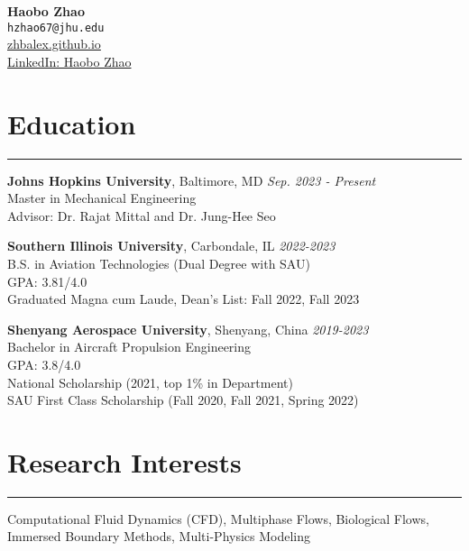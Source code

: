 \documentclass[11pt]{article}
\begin{document}

\begin{center}
    {\LARGE \textbf{Haobo Zhao}} \\
    \vspace{2mm}
    \small
    \texttt{hzhao67@jhu.edu} \\
    \vspace{1mm}
    \href{https://zhbalex.github.io}{zhbalex.github.io} \\
    \href{https://www.linkedin.com/in/haobo-zhao-035529229}{LinkedIn: Haobo Zhao}
\end{center}

\vspace{2mm}

\section*{Education}
\hrule

\noindent\textbf{Johns Hopkins University}, Baltimore, MD \hfill \textit{Sep. 2023 - Present} \\
Master in Mechanical Engineering \\
Advisor: Dr. Rajat Mittal and Dr. Jung-Hee Seo

\vspace{2mm}

\noindent\textbf{Southern Illinois University}, Carbondale, IL \hfill \textit{2022-2023} \\
B.S. in Aviation Technologies (Dual Degree with SAU) \\
GPA: 3.81/4.0 \\
Graduated Magna cum Laude, Dean's List: Fall 2022, Fall 2023

\vspace{2mm}

\noindent\textbf{Shenyang Aerospace University}, Shenyang, China \hfill \textit{2019-2023} \\
Bachelor in Aircraft Propulsion Engineering \\
GPA: 3.8/4.0 \\
National Scholarship (2021, top 1\% in Department) \\
SAU First Class Scholarship (Fall 2020, Fall 2021, Spring 2022)

\vspace{2mm}

\section*{Research Interests}
\hrule
Computational Fluid Dynamics (CFD), Multiphase Flows, Biological Flows, Immersed Boundary Methods, Multi-Physics Modeling
\end{document}

